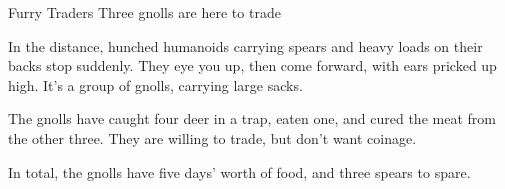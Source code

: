 {Furry Traders}%
{Three gnolls are here to trade}%

\begin{boxtext}
  In the distance, hunched humanoids carrying spears and heavy loads on their backs stop suddenly.
  They eye you up, then come forward, with ears pricked up high.
  It's a group of gnolls, carrying large sacks.
\end{boxtext}

The gnolls have caught four deer in a trap, eaten one, and cured the meat from the other three.
They are willing to trade, but don't want coinage.

In total, the gnolls have five days' worth of food, and three spears to spare.


